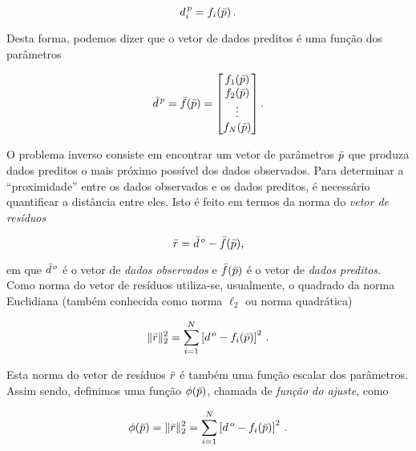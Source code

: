 \begin{equation}
d^{\thinspace p}_i = f_i(\bar{p})\thinspace.
\label{eq:fi}
\end{equation}

\noindent Desta forma, podemos dizer que o vetor de dados preditos é uma função
dos parâmetros

\begin{equation}
\bar{d}^{\thinspace p}= \bar{f}(\bar{p}) =
    \begin{bmatrix}
    f_1(\bar{p}) \\
    f_2(\bar{p}) \\
    \vdots \\
    f_N(\bar{p})
    \end{bmatrix}.
\label{eq:dados_preditos}
\end{equation}

\indent O problema inverso consiste em encontrar um vetor de parâmetros $\bar{p}$
que produza dados preditos o mais próximo possível dos dados observados.
Para determinar a ``proximidade'' entre os dados observados e os dados preditos,
é necessário quantificar a distância entre eles.
Isto é feito em termos da norma do {\it vetor de resíduos}

\begin{equation}
\bar{r} = \bar{d}^{\thinspace o} - \bar{f}(\bar{p}),
\end{equation}

\noindent em que $\bar{d}^{\thinspace o}$ é o vetor de {\it dados observados}
e $\bar{f}(\bar{p})$ é o vetor de {\it dados preditos}.
\\
\indent Como norma do vetor de resíduos utiliza-se, usualmente, o quadrado da
norma Euclidiana (também conhecida como norma $\ell_2$ ou norma quadrática)

\begin{equation}
\lVert\bar{r}\rVert_2^2 =
    \sum\limits_{i=1}^N \left[d^{\thinspace o} - f_i(\bar{p})\right]^2 \, .
\end{equation}

\noindent Esta norma do vetor de resíduos $\bar{r}$ é também uma função escalar
dos parâmetros. Assim sendo, definimos uma função $\phi(\bar{p})$, chamada de
{\it função do ajuste}, como

\begin{equation}
\phi(\bar{p}) = \lVert\bar{r}\rVert_2^2 =
    \sum\limits_{i=1}^N \left[d^{\thinspace o} - f_i(\bar{p})\right]^2 \, .
\label{eq:ajuste_sum}
\end{equation}

